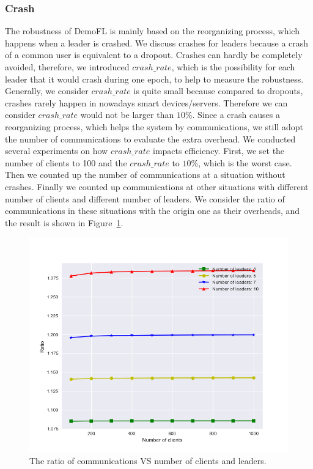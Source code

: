 \subsubsection{Crash}
The robustness of DemoFL is mainly based on the reorganizing process, which happens when a leader is crashed. We discuss crashes for leaders because a crash of a common user is equivalent to a dropout. Crashes can hardly be completely avoided, therefore, we introduced $crash\_rate$, which is the possibility for each leader that it would crash during one epoch, to help to measure the robustness. Generally, we consider $crash\_rate$ is quite small because compared to dropouts, crashes rarely happen in nowadays smart devices/servers. Therefore we can consider $crash\_rate$ would not be larger than $10\%$. Since a crash causes a reorganizing process, which helps the system by communications, we still adopt the number of communications to evaluate the extra overhead. We conducted several experiments on how $crash\_rate$ impacts efficiency. First, we set the number of clients to 100 and the $crash\_rate$ to $10\%$, which is the worst case. Then we counted up the number of communications at a situation without crashes. Finally we counted up communications at other situations with different number of clients and different number of leaders. We consider the ratio of communications in these situations with the origin one as their overheads, and the result is shown in Figure~\ref{crash-leader}. 

\begin{figure}[!ht]
    \centering
    \includegraphics[width=\columnwidth]{img/crash-leader.png}
    \caption{The ratio of communications VS number of clients and leaders.}
    \label{crash-leader}
\end{figure}

